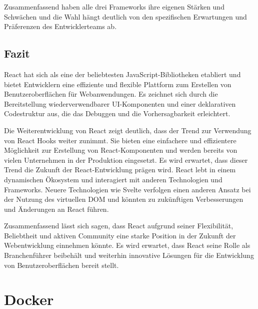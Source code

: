 Zusammenfassend haben alle drei Frameworks ihre eigenen Stärken und Schwächen und die Wahl hängt deutlich von den spezifischen Erwartungen und Präferenzen des Entwicklerteams ab.

\subsection{Fazit}
React hat sich als eine der beliebtesten JavaScript-Bibliotheken etabliert und bietet Entwicklern eine effiziente und flexible Plattform zum Erstellen von Benutzeroberflächen für Webanwendungen. Es zeichnet sich durch die Bereitstellung wiederverwendbarer UI-Komponenten und einer deklarativen Codestruktur aus, die das Debuggen und die Vorhersagbarkeit erleichtert.

Die Weiterentwicklung von React zeigt deutlich, dass der Trend zur Verwendung von React Hooks weiter zunimmt. Sie bieten eine einfachere und effizientere Möglichkeit zur Erstellung von React-Komponenten und werden bereits von vielen Unternehmen in der Produktion eingesetzt. Es wird erwartet, dass dieser Trend die Zukunft der React-Entwicklung prägen wird. React lebt in einem dynamischen Ökosystem und interagiert mit anderen Technologien und Frameworks. Neuere Technologien wie Svelte verfolgen einen anderen Ansatz bei der Nutzung des virtuellen DOM und könnten zu zukünftigen Verbesserungen und Änderungen an React führen.

Zusammenfassend lässt sich sagen, dass React aufgrund seiner Flexibilität, Beliebtheit und aktiven Community eine starke Position in der Zukunft der Webentwicklung einnehmen könnte. Es wird erwartet, dass React seine Rolle als Branchenführer beibehält und weiterhin innovative Lösungen für die Entwicklung von Benutzeroberflächen bereit stellt.

\section{Docker}

\begin{figure}
	\centering
\end{figure}

